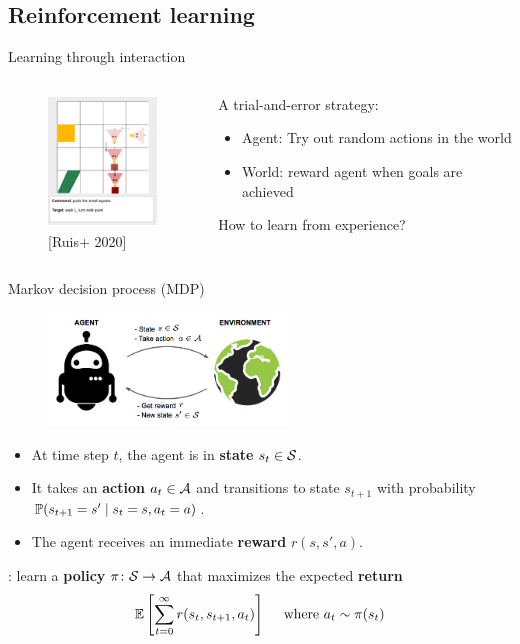\documentclass[usenames,dvipsnames,notes]{beamer}
\begin{document}
\subsection{Reinforcement learning}
\begin{frame}
    {Learning through interaction}
    \begin{columns}
        \begin{column}{0.4\textwidth}
    \begin{figure}
        \includegraphics[height=3.5cm]{figures/instruction}
        \caption{[Ruis+ 2020]}
    \end{figure}
        \end{column}
        \begin{column}{0.6\textwidth}
    A trial-and-error strategy:\\
    \begin{itemize}
        \item Agent: Try out random actions in the world 
        \item World: reward agent when goals are achieved
    \end{itemize}
    How to learn from experience?
        \end{column}
    \end{columns}
\end{frame}

\begin{frame}
    {Markov decision process (MDP)}
    \begin{figure}
        \includegraphics[height=3cm]{figures/rl}
    \end{figure}
    \vspace{-2em}
    \begin{itemize}
        \item At time step $t$, the agent is in \textbf{state} $s_t\in\mathcal{S}$.
        \item It takes an \textbf{action} $a_t\in\mathcal{A}$ and transitions to state $s_{t+1}$ with probability $\mathbb{P}(s_{t+1}=s'\mid s_t=s, a_t=a)$.
        \item The agent receives an immediate \textbf{reward} $r(s, s', a)$.
    \end{itemize}
    : learn a \textbf{policy} $\pi\colon \mathcal{S} \to \mathcal{A}$ that maximizes the expected \textbf{return}
    $$
    \mathbb{E}\left[ \sum_{t=0}^\infty r(s_t, s_{t+1}, a_t) \right] \quad \text{ where } a_t\sim\pi(s_t) 
    $$
\end{frame}
\end{document}
